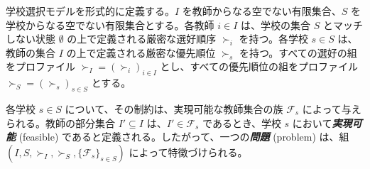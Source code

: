 \documentclass[12pt, a4paper]{article}
\theoremstyle{definition}
\theoremstyle{remark}
\theoremstyle{plain}
\begin{document}











学校選択モデルを形式的に定義する。$I$ を教師からなる空でない有限集合、$S$ を学校からなる空でない有限集合とする。各教師 $i \in I$ は、学校の集合 $S$ とマッチしない状態 $\emptyset$ の上で定義される厳密な選好順序 $\succ_i$ を持つ。各学校 $s \in S$ は、教師の集合 $I$ の上で定義される厳密な優先順位 $\succ_s$ を持つ。すべての選好の組をプロファイル $\succ_I = (\succ_i)_{i \in I}$ とし、すべての優先順位の組をプロファイル $\succ_S = (\succ_s)_{s \in S}$ とする。

各学校 $s \in S$ について、その制約は、実現可能な教師集合の族 $\mathcal{F}_s$ によって与えられる。教師の部分集合 $I' \subseteq I$ は、$I' \in \mathcal{F}_s$ であるとき、学校 $s$ において\textbf{\textit{実現可能}} (feasible) であると定義される。したがって、一つの\textbf{\textit{問題}} (problem) は、組 $(I, S, \succ_I, \succ_S, \{\mathcal{F}_s\}_{s \in S})$ によって特徴づけられる。
\end{document}

